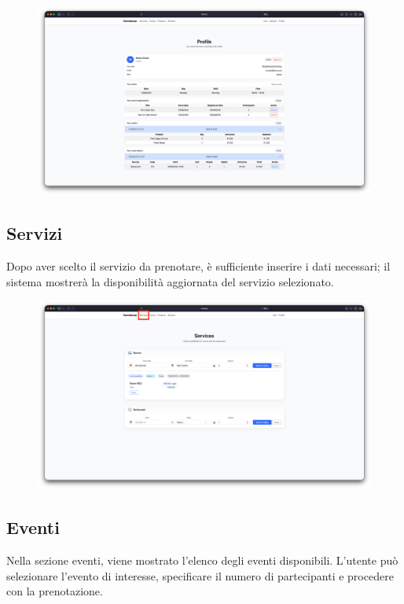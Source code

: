 \documentclass[a4paper,12pt]{report}
\begin{document}
\begin{figure}[H]
    \centering
    \includegraphics[width=\textwidth, trim=0 0 0 0]{./img/users/profile.png}
    \vspace{-1em}
    \label{fig:profile}
\end{figure}

\subsection*{Servizi}
Dopo aver scelto il servizio da prenotare, è sufficiente inserire i dati necessari; il sistema 
mostrerà la disponibilità aggiornata del servizio selezionato.

\begin{figure}[H]
    \centering
    \includegraphics[width=\textwidth, trim=0 0 0 0]{./img/users/services.png}
    \vspace{-1em}
    \label{fig:services}
\end{figure}

\subsection*{Eventi}
Nella sezione eventi, viene mostrato l'elenco degli eventi disponibili. L'utente può selezionare 
l'evento di interesse, specificare il numero di partecipanti e procedere con la prenotazione. 
\end{document}
